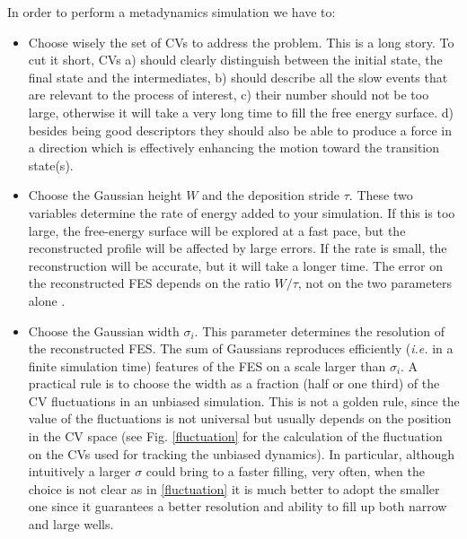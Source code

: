 \documentclass[10pt,fleqn,a4paper]{report}
\begin{document}
In order to perform a metadynamics simulation we have to:
\begin{itemize}
\item Choose wisely the set of CVs to address the problem. This is a long story. 
To cut it short, CVs 
a)  should clearly distinguish between the initial state, the final state and the intermediates,
b) should describe all the slow events that are relevant to the process of interest,
c) their number should not be too large, otherwise it will take a very long time to fill the free energy surface.
d) besides being good descriptors they should also be able to produce a force in a direction which is effectively enhancing the motion toward the transition state(s).

\item Choose the Gaussian height $W$ and the deposition stride $\tau$.
These two variables determine the rate of energy added to your simulation. 
If this is too large, the free-energy surface will be explored at a fast pace, 
but the reconstructed profile will be affected by large errors. 
If the rate is small, the reconstruction will be accurate, but it will take a longer time.
The error on the reconstructed FES depends on the ratio $W/\tau$, not on the two parameters alone \cite{error}.
\item Choose the Gaussian width $\sigma_i$. This parameter determines the resolution
of the reconstructed FES. The sum of Gaussians reproduces efficiently 
(\emph{i.e.} in a finite simulation time) features of the FES on a scale larger than $\sigma_i$. 
A practical rule is to choose the width as a fraction (half or one third) of the
CV fluctuations in an unbiased simulation. This is not a golden rule, since the value of the fluctuations
is not universal but usually depends on the position in the CV space (see Fig. \ref{fluctuation} for the calculation 
of the fluctuation on the CVs used for tracking the unbiased dynamics). 
In particular, although intuitively a larger $\sigma$ could bring to a faster filling, very often, when the choice is not clear as in \ref{fluctuation} it is much better to adopt the smaller one since it guarantees a better resolution and ability to fill up both narrow and large wells.
\end{itemize}
\end{document}
